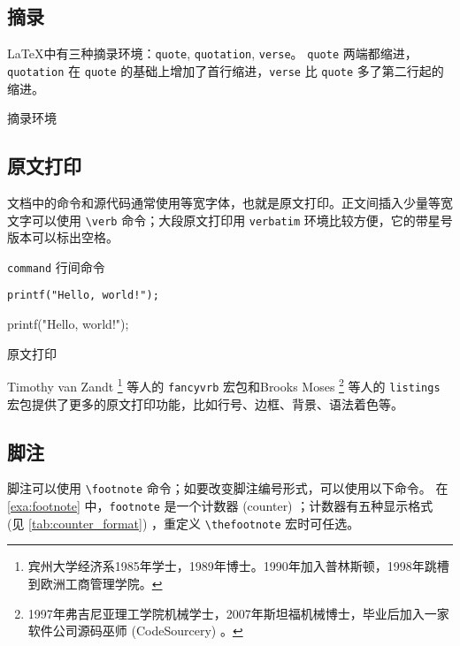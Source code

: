 \subsection{摘录}

\LaTeX 中有三种摘录环境：\texttt{quote}, \texttt{quotation}, \texttt{verse}。 \texttt{quote} 两端都缩进， \texttt{quotation} 在 \texttt{quote} 的基础上增加了首行缩进，\texttt{verse} 比 \texttt{quote} 多了第二行起的缩进。

\begin{example}[h]
\caption{摘录环境}
\end{example}

\subsection{原文打印}
文档中的命令和源代码通常使用等宽字体，也就是原文打印。正文间插入少量等宽文字可以使用 \verb|\verb| 命令；大段原文打印用 \texttt{verbatim} 环境比较方便，它的带星号版本可以标出空格。

\begin{example}[h]
\begin{RLDemo}[numbers=left]
\verb|command| 行间命令
\begin{verbatim}
printf("Hello, world!");
\end{verbatim}
\begin{verbatim*}
printf("Hello, world!");
\end{verbatim*}
\end{RLDemo}
\caption{原文打印}
\end{example}

Timothy van Zandt\indexVanZandt{} \footnote{宾州大学经济系1985年学士，1989年博士。1990年加入普林斯顿，1998年跳槽到欧洲工商管理学院。} 等人的 \texttt{fancyvrb} 宏包\citep{Zandt_2008}和Brooks Moses\indexMoses{} \footnote{1997年弗吉尼亚理工学院机械学士，2007年斯坦福机械博士，毕业后加入一家软件公司源码巫师 (CodeSourcery) 。} 等人的 \texttt{listings} 宏包\citep{Moses_2007}提供了更多的原文打印功能，比如行号、边框、背景、语法着色等。

\subsection{脚注}

脚注可以使用 \verb|\footnote| 命令；如要改变脚注编号形式，可以使用以下命令。
在 \autoref{exa:footnote} 中，\verb|footnote| 是一个计数器 (counter) ；计数器有五种显示格式 (见 \autoref{tab:counter_format}) ，重定义 \verb|\thefootnote| 宏时可任选。

